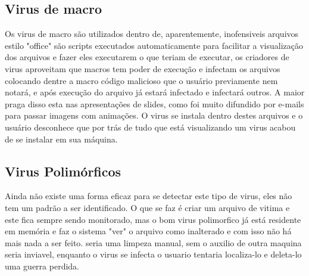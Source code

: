 \subsection{Virus de macro}
Os virus de macro são utilizados dentro de, aparentemente, inofensiveis arquivos estilo "office" são scripts executados automaticamente para facilitar a visualização dos arquivos e fazer eles executarem o que teriam de executar, os criadores de virus aproveitam que macros tem poder de execução e infectam os arquivos colocando dentre a macro código malicioso que o usuário previamente nem notará, e após execução do arquivo já estará infectado e infectará outros. A maior praga disso esta nas apresentações de slides, como foi muito difundido por e-mails para passar imagens com animações. O virus se instala dentro destes arquivos e o usuário desconhece que por trás de tudo que está visualizando um virus acabou de se instalar em sua máquina.
\subsection{Virus Polimórficos}
Ainda não existe uma forma eficaz para se detectar este tipo de virus, eles não tem um padrão a ser identificado. O que se faz é criar um arquivo de vitima e este fica sempre sendo monitorado, mas o bom virus polimorfico já está residente em memória e faz o sistema "ver" o arquivo como inalterado e com isso não há mais nada a ser feito. seria uma limpeza manual, sem o auxilio de outra maquina seria inviavel, enquanto o virus se infecta o usuario tentaria localiza-lo e deleta-lo uma guerra perdida.

